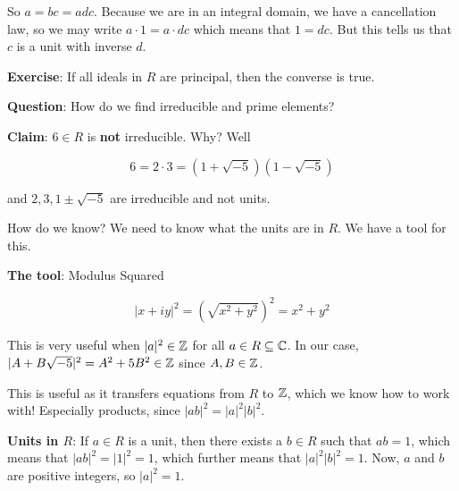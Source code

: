\documentclass[12pt]{article}
\begin{document}
So $a = bc = adc$. Because we are in an integral domain, we have a cancellation
law, so we may write $a \cdot 1 = a \cdot dc$ which means that $1 = dc$. But
this tells us that $c$ is a unit with inverse $d$.

{\bf Exercise}: If all ideals in $R$ are principal, then the converse is true.


{\bf Question}: How do we find irreducible and prime elements?


{\bf Claim}: $6 \in R$ is {\bf not} irreducible. Why? Well

\[
  6 = 2 \cdot 3 = (1 + \sqrt{-5})(1 - \sqrt{-5})
\]

and $2, 3, 1 \pm \sqrt{-5}$ are irreducible and not units.

How do we know? We need to know what the units are in $R$. We have a tool for
this.

{\bf The tool}: Modulus Squared

\[
  |x + iy|^2 = (\sqrt{x^2 + y^2})^2 = x^2 + y^2
\]

This is very useful when $|a|^2 \in {\mathbb Z}$ for all $a \in R \subseteq {\mathbb C}$. In our
case, $|A + B\sqrt{-5}|^2 = A^2 + 5B^2 \in {\mathbb Z}$ since $A, B \in {\mathbb Z}$.

This is useful as it transfers equations from $R$ to ${\mathbb Z}$, which we know how to
work with! Especially products, since $|ab|^2 = |a|^2 |b|^2$.

{\bf Units in $R$}: If $a \in R$ is a unit, then there exists a $b \in R$ such
that $ab = 1$, which means that $|ab|^2 = |1|^2 = 1$, which further means that
$|a|^2 |b|^2 = 1$. Now, $a$ and $b$ are positive integers, so $|a|^2 = 1$.
\end{document}
